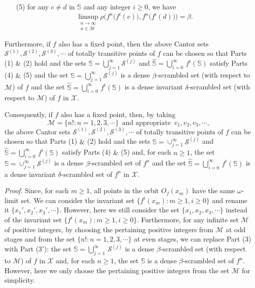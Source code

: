 \documentclass[12pt]{article}
\begin{document}
{\begin{itemize}
\item[{\rm (5)}]
for any $c \ne d$ in $\mathbb S$ and any integer $i \ge 0$, we have 
$$
\limsup_{\substack{n \to \infty \\ n \in \mathcal M}} \rho\bigg(f^n\big(f^i(c)\big), f^n\big(f^i(d)\big)\bigg) = \beta.
$$
\end{itemize}
Furthermore, if $f$ also has a fixed point, then the above Cantor sets $\mathcal S^{(1)}, \mathcal S^{(2)}, \mathcal S^{(3)}, \cdots$ of totally transitive points of $f$ can be chosen so that Parts (1) $\&$ (2) hold and the sets $\mathbb S = \bigcup_{j=1}^\infty \mathcal S^{(j)}$ and $\widehat {\mathbb S} = \bigcup_{i=0}^{\infty} \, f^i(\mathbb S)$ satisfy Parts (4) $\&$ (5) and the set $\mathbb S = \bigcup_{j=1}^\infty \mathcal S^{(j)}$ is a dense $\beta$-scrambled set (with respect to $\mathcal M$) of $f$ and the set $\widehat {\mathbb S} = \bigcup_{i=0}^{\infty} \, f^i(\mathbb S)$ is a dense {\rm invariant} $\delta$-scrambled set (with respect to $\mathcal M$) of $f$ in $\mathcal X$.

Consequently, if $f$ also has a fixed point, then, by taking 
$$
\mathcal M = \{ n!: n = 1, 2, 3, \cdots \} \,\,\, \text{and appropriate} \,\,\, v_1, v_2, v_3, \cdots,
$$
the above Cantor sets $\mathcal S^{(1)}, \mathcal S^{(2)}, \mathcal S^{(3)}, \cdots$ of totally transitive points of $f$ can be chosen so that Parts (1) $\&$ (2) hold and the sets $\mathbb S = \cup_{j=1}^\infty \mathcal S^{(j)}$ and $\widehat {\mathbb S} = \bigcup_{i=0}^{\infty} \, f^i(\mathbb S)$ satisfy Parts (4) $\&$ (5) and, for each $n \ge 1$, the set $\mathbb S = \cup_{j=1}^\infty \mathcal S^{(j)}$ is a dense $\beta$-scrambled set of $f^n$ and the set $\widehat {\mathbb S} = \bigcup_{i=0}^{\infty} \, f^i(\mathbb S)$ is a dense {\rm invariant} $\delta$-scrambled set of $f^n$ in $\mathcal X$.}

\noindent
{\it Proof.}
Since, for each $m \ge 1$, all points in the orbit $O_f(x_m)$ have the same $\omega$-limit set.  We can consider the invariant set $\{ f^i(x_m): m \ge 1, i \ge 0 \}$ and rename it $\{ x_1', x_2', x_3', \cdots \}$.  However, here we still consider the set $\{ x_1, x_2, x_3, \cdots \}$ instead of the invariant set $\{ f^i(x_m): m \ge 1, i \ge 0 \}$.  Furthermore, for any infinite set $\mathcal M$ of positive integers, by choosing the pertaining positive integers from $\mathcal M$ at odd stages and from the set $\{ n!: n = 1, 2, 3, \cdots \}$ at even stages, we can replace Part (3) with Part ($3'$): the set $\mathbb S = \bigcup_{j=1}^\infty \, \mathcal S^{(j)}$ is a dense $\beta$-scrambled set (with respect to $\mathcal M$) of $f$ in $\mathcal X$ and, for each $n \ge 1$, the set $\mathbb S$ is a dense $\beta$-scrambled set of $f^n$.  However, here we only choose the pertaining positive integers from the set $\mathcal M$ for simplicity.
\end{document}
